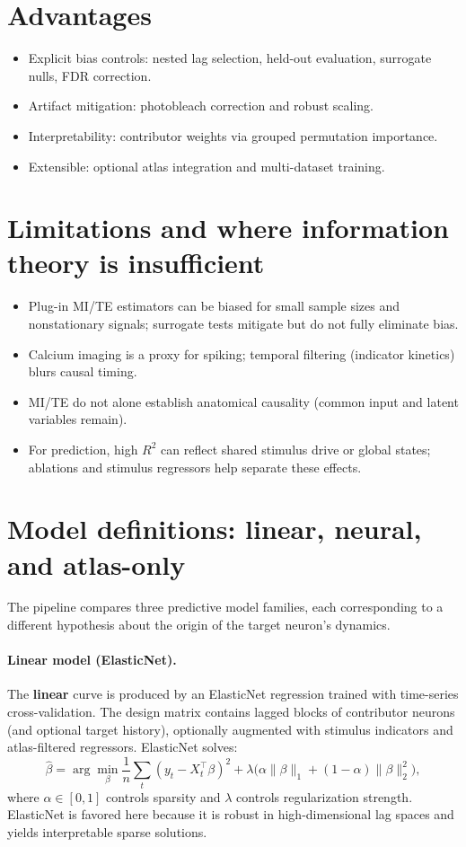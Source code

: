 \documentclass[11pt]{article}
\begin{document}
\section{Advantages}
\begin{itemize}
  \item Explicit bias controls: nested lag selection, held-out evaluation, surrogate nulls, FDR correction.
  \item Artifact mitigation: photobleach correction and robust scaling.
  \item Interpretability: contributor weights via grouped permutation importance.
  \item Extensible: optional atlas integration and multi-dataset training.
\end{itemize}

\section{Limitations and where information theory is insufficient}
\begin{itemize}
  \item Plug-in MI/TE estimators can be biased for small sample sizes and nonstationary signals; surrogate tests mitigate but do not fully eliminate bias.
  \item Calcium imaging is a proxy for spiking; temporal filtering (indicator kinetics) blurs causal timing.
  \item MI/TE do not alone establish anatomical causality (common input and latent variables remain).
  \item For prediction, high $R^2$ can reflect shared stimulus drive or global states; ablations and stimulus regressors help separate these effects.
\end{itemize}

\section{Model definitions: linear, neural, and atlas-only}
The pipeline compares three predictive model families, each corresponding to a different hypothesis about the origin of the target neuron's dynamics.

\paragraph{Linear model (ElasticNet).}
The \textbf{linear} curve is produced by an ElasticNet regression trained with time-series cross-validation. The design matrix contains lagged blocks of contributor neurons (and optional target history), optionally augmented with stimulus indicators and atlas-filtered regressors. ElasticNet solves:
\[
\hat{\beta}=\arg\min_{\beta}\frac{1}{n}\sum_{t}(y_t-X_t^\top\beta)^2+\lambda\Big(\alpha\|\beta\|_1+(1-\alpha)\|\beta\|_2^2\Big),
\]
where $\alpha\in[0,1]$ controls sparsity and $\lambda$ controls regularization strength. ElasticNet is favored here because it is robust in high-dimensional lag spaces and yields interpretable sparse solutions.
\end{document}
